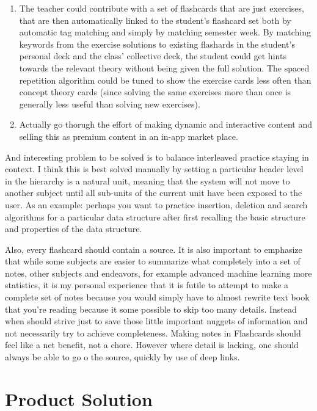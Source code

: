 \begin{enumerate}
\def\labelenumi{\arabic{enumi}.}
\setcounter{enumi}{3}
\item
  The teacher could contribute with a set of flashcards that are just
  exercises, that are then automatically linked to the student's
  flashcard set both by automatic tag matching and simply by matching
  semester week. By matching keywords from the exercise solutions to
  existing flashards in the student's personal deck and the class'
  collective deck, the student could get hints towards the relevant
  theory without being given the full solution. The spaced repetition
  algorithm could be tuned to show the exercise cards less often than
  concept theory cards (since solving the same exercises more than once
  is generally less useful than solving new exercises).
\item
  Actually go thorugh the effort of making dynamic and interactive
  content and selling this as premium content in an in-app market place.
\end{enumerate}

And interesting problem to be solved is to balance interleaved practice
staying in context. I think this is best solved manually by setting a
particular header level in the hierarchy is a natural unit, meaning that
the system will not move to another subject until all sub-units of the
current unit have been exposed to the user. As an example: perhaps you
want to practice insertion, deletion and search algorithms for a
particular data structure after first recalling the basic structure and
properties of the data structure.

Also, every flashcard should contain a source. It is also important to
emphasize that while some subjects are easier to summarize what
completely into a set of notes, other subjects and endeavors, for
example advanced machine learning more statistics, it is my personal
experience that it is futile to attempt to make a complete set of notes
because you would simply have to almost rewrite text book that you're
reading because it some possible to skip too many details. Instead when
should strive just to save those little important nuggets of information
and not necessarily try to achieve completeness. Making notes in
Flashcards should feel like a net benefit, not a chore. However where
detail is lacking, one should always be able to go o the source, quickly
by use of deep links.

\pagebreak

\section{Product Solution}\label{product-solution}

